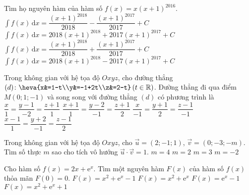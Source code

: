\begin{ex}%
Tìm họ nguyên hàm của hàm số $f(x)=x(x+1)^{2016}$.
\choice
{\True $\displaystyle \int f(x) \mathrm{\, d}x=\dfrac{(x+1)^{2018}}{2018}-\dfrac{(x+1)^{2017}}{2017}+C$}
{$\displaystyle \int f(x) \mathrm{\, d}x=2018(x+1)^{2018}+2017(x+1)^{2017}+C$}
{$\displaystyle \int f(x) \mathrm{\, d}x=\dfrac{(x+1)^{2018}}{2018}+\dfrac{(x+1)^{2017}}{2017}+C$}
{$\displaystyle \int f(x) \mathrm{\, d}x=2018(x+1)^{2018}-2017(x+1)^{2017}+C$}
\end{ex}
\begin{ex}%
Trong không gian với hệ tọa độ $Oxyz$, cho đường thẳng $(d)\colon \heva{x&=1-t\\y&=-1+2t\\z&=2-t}\,(t\in \mathbb{R})$. Đường thẳng đi qua điểm $M(0;1;-1)$ và song song với đường thẳng $(d)$ có phương trình là
\choice
{\True $\dfrac{x}{1}=\dfrac{y-1}{-2}=\dfrac{z+1}{1}$}
{$\dfrac{x+1}{1}=\dfrac{y-2}{-1}=\dfrac{z+1}{2}$}
{$\dfrac{x}{-1}=\dfrac{y+1}{2}=\dfrac{z-1}{-1}$}
{$\dfrac{x-1}{1}=\dfrac{y+2}{-1}=\dfrac{z-1}{2}$}
\end{ex}
\begin{ex}%
Trong không gian với hệ tọa độ $Oxyz$, cho $\vec{u}=(2;-1;1)$,  $\vec{v}=(0;-3;-m)$. Tìm số thực $m$ sao cho tích vô hướng $\vec{u}\cdot \vec{v}=1$.
\choice
{$m=4$}
{\True $m=2$}
{$m=3$}
{$m=-2$}
\end{ex}
\begin{ex}%
Cho hàm số $f(x)=2x+\mathrm{e}^x$. Tìm một nguyên hàm $F(x)$ của hàm số $f(x)$ thỏa mãn $F(0)=0$.
\choice
{\True $F(x)=x^2+\mathrm{e}^x-1$}
{$F(x)=x^2+\mathrm{e}^x$}
{$F(x)=\mathrm{e}^x-1$}
{$F(x)=x^2+\mathrm{e}^x+1$}
\end{ex}
